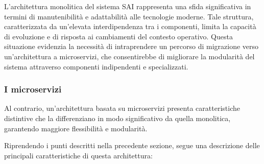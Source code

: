             \vspace{0.2 em}
            \noindent L'architettura monolitica del sistema SAI rappresenta una sfida significativa in termini di manutenibilità e adattabilità alle tecnologie moderne. Tale struttura, caratterizzata da un'elevata interdipendenza tra i componenti, limita la capacità di evoluzione e di risposta ai cambiamenti del contesto operativo. Questa situazione evidenzia la necessità di intraprendere un percorso di migrazione verso un'architettura a microservizi, che consentirebbe di migliorare la modularità del sistema attraverso componenti indipendenti e specializzati. 

            \subsubsection{I microservizi}
            
            Al contrario, un’architettura basata su microservizi presenta caratteristiche distintive che la differenziano in modo significativo da quella monolitica, garantendo maggiore flessibilità e modularità.            
            
            \noindent Riprendendo i punti descritti nella precedente sezione, segue una descrizione delle principali caratteristiche di questa architettura:  

